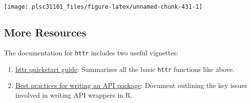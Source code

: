 \documentclass[
]{book}
\newenvironment{Shaded}{\begin{snugshade}}{\end{snugshade}}
\newcommand{\CommentTok}[1]{\textcolor[rgb]{0.56,0.35,0.01}{\textit{#1}}}
\newcommand{\DataTypeTok}[1]{\textcolor[rgb]{0.13,0.29,0.53}{#1}}
\newcommand{\DecValTok}[1]{\textcolor[rgb]{0.00,0.00,0.81}{#1}}
\newcommand{\KeywordTok}[1]{\textcolor[rgb]{0.13,0.29,0.53}{\textbf{#1}}}
\newcommand{\NormalTok}[1]{#1}
\newcommand{\OperatorTok}[1]{\textcolor[rgb]{0.81,0.36,0.00}{\textbf{#1}}}
\newcommand{\StringTok}[1]{\textcolor[rgb]{0.31,0.60,0.02}{#1}}
\providecommand{\tightlist}{%
  \setlength{\itemsep}{0pt}\setlength{\parskip}{0pt}}
\begin{document}
\begin{Shaded}
\end{Shaded}

\begin{center}\texttt{[image: plsc31101\_files/figure-latex/unnamed-chunk-431-1]} \end{center}

\hypertarget{more-resources}{%
\subsection{More Resources}\label{more-resources}}

The documentation for \texttt{httr} includes two useful vignettes:

\begin{enumerate}
\def\labelenumi{\arabic{enumi}.}
\tightlist
\item
  \href{https://cran.r-project.org/web/packages/httr/vignettes/quickstart.html}{httr quickstart guide}: Summarizes all the basic \texttt{httr} functions like above.
\item
  \href{https://cran.r-project.org/web/packages/httr/vignettes/api-packages.html}{Best practices for writing an API package}: Document outlining the key issues involved in writing API wrappers in R.
\end{enumerate}
\end{document}
